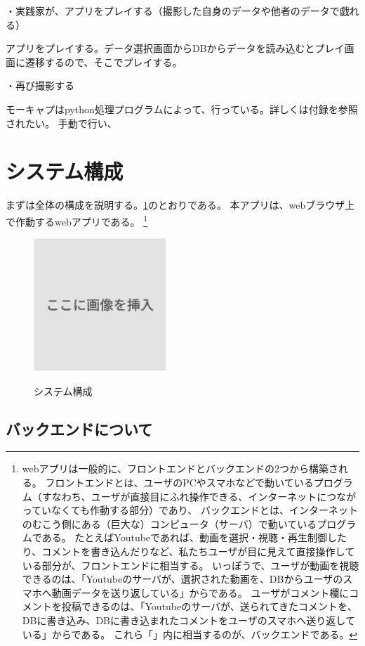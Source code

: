 ・実践家が、アプリをプレイする（撮影した自身のデータや他者のデータで戯れる）

アプリをプレイする。データ選択画面からDBからデータを読み込むとプレイ画面に遷移するので、そこでプレイする。

・再び撮影する

モーキャプはpython処理プログラムによって、行っている。詳しくは付録を参照されたい。
手動で行い、

\section{システム構成}
まずは全体の構成を説明する。\ref{fig:システム構成}のとおりである。
本アプリは、webブラウザ上で作動するwebアプリである。
\footnote{webアプリは一般的に、フロントエンドとバックエンドの2つから構築される。
フロントエンドとは、ユーザのPCやスマホなどで動いているプログラム（すなわち、ユーザが直接目にふれ操作できる、インターネットにつながっていなくても作動する部分）であり、
バックエンドとは、インターネットのむこう側にある（巨大な）コンピュータ（サーバ）で動いているプログラムである。
たとえばYoutubeであれば、動画を選択・視聴・再生制御したり、コメントを書き込んだりなど、私たちユーザが目に見えて直接操作している部分が、フロントエンドに相当する。
いっぽうで、ユーザが動画を視聴できるのは、「Youtubeのサーバが、選択された動画を、DBからユーザのスマホへ動画データを送り返している」からである。
ユーザがコメント欄にコメントを投稿できるのは、「Youtubeのサーバが、送られてきたコメントを、DBに書き込み、DBに書き込まれたコメントをユーザのスマホへ送り返している」からである。
これら「」内に相当するのが、バックエンドである。}

\begin{figure}[h]
  \centering
  \caption{システム構成}  
  \includegraphics[width=5cm]{images/dummy.png}
  \label{fig:システム構成}
\end{figure}

\subsection{バックエンドについて}

